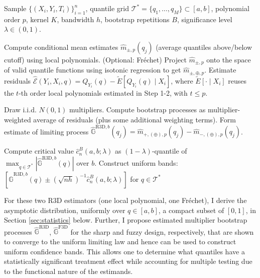 \documentclass[12pt]{article}
\begin{document}
\begin{algorithm}[h!]
\caption{Multiplier Bootstrap for Uniform Confidence Bands}
\label{alg:bootstrap}
\begin{algorithmic}[1]
\Require Sample $\{(X_i, Y_i, T_i)\}_{i=1}^n$, quantile grid $\mathcal{T}^* = \{q_1, \dots, q_M\} \subset [a,b]$, polynomial order $p$, kernel $K$, bandwidth $h$, bootstrap repetitions $B$, significance level $\lambda \in (0,1)$.

\State Compute conditional mean estimates $\hat{m}_{\pm,p}(q_j)$ (average quantiles above/below cutoff) using local polynomials.
\State (Optional: Fr\'echet) Project $\hat{m}_{\pm,p}$ onto the space of valid quantile functions using isotonic regression to get $\hat{m}_{\pm,\oplus,p}$.
\State Estimate residuals $\hat{\mathcal{E}}(Y_i, X_i, q) = Q_{Y_i}(q) -  \tilde{E}[Q_{Y_i}(q) \mid X_i]$, where $\tilde{E}[\cdot \mid X_i]$ reuses the $t$-th order local polynomials estimated in Step 1-2, with $t \leq p$.  
\EndFor

\State Draw i.i.d. $N(0,1)$ multipliers.
\State Compute bootstrap processes as multiplier-weighted average of residuals (plus some additional weighting terms).
\EndFor
\State Form estimate of limiting process $\hat{\mathbb{G}}^{\mathrm{R3D},b}(q_j) = \hat{m}_{+, (\oplus),p}(q_j) - \hat{m}_{-, (\oplus),p}(q_j)$.
\EndFor

\State Compute critical value $\hat{c}_n^B(a,b;\lambda)$ as $(1-\lambda)$-quantile of $\max_{q \in \mathcal{T}^*} |\hat{\mathbb{G}}^{\mathrm{R3D},b}(q)|$ over $b$.
\State Construct uniform bands: $[\hat{\mathbb{G}}^{\mathrm{R3D},b}(q) \pm (\sqrt{nh})^{-1} \hat{c}_n^B(a,b;\lambda)]$ for $q \in \mathcal{T}^*$
\end{algorithmic}
\end{algorithm}



For these two R3D estimators (one local polynomial, one Fr\'echet), I derive the asymptotic distribution, uniformly over $q \in [a,b]$, a compact subset of $[0,1]$, in Section \ref{sec:statistics} below. Further, I propose estimated multiplier bootstrap processes $\hat{\mathbb{G}}^{\mathrm{R3D}}$, $\hat{\mathbb{G}}^{\mathrm{F3D}}$ for the sharp and fuzzy design, respectively, that are shown to converge to the uniform limiting law and hence can be used to construct uniform confidence bands. This allows one to determine what quantiles have a statistically significant treatment effect while accounting for multiple testing due to the functional nature of the estimands. 
\end{document}
